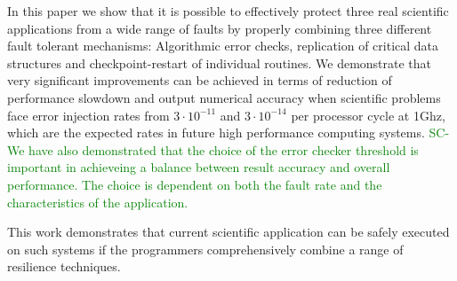 \documentclass[10pt, conference, compsocconf]{IEEEtran}
\newcommand{\sui}[1]{%
  \textcolor{green}{SC-#1}
}
\begin{document}
In this paper we show that it is possible to effectively protect three real scientific applications from a wide range of faults by properly combining three different fault tolerant mechanisms:
Algorithmic error checks, replication of critical data structures and checkpoint-restart of individual routines.
We demonstrate that very significant improvements can be achieved in terms of reduction of performance slowdown and output numerical accuracy when scientific problems face error injection rates from $3 \cdot 10^{-11}$ and $3 \cdot 10^{-14}$ per processor cycle at 1Ghz, which are the expected rates in future high performance computing systems.
\sui{We have also demonstrated that the choice of the error checker threshold is important in achieveing a balance between result accuracy and overall performance. The choice is dependent on both the fault rate and the characteristics of the application.}
This work demonstrates that current scientific application can be safely executed on such systems if the programmers comprehensively combine a range of resilience techniques.



\end{document}
